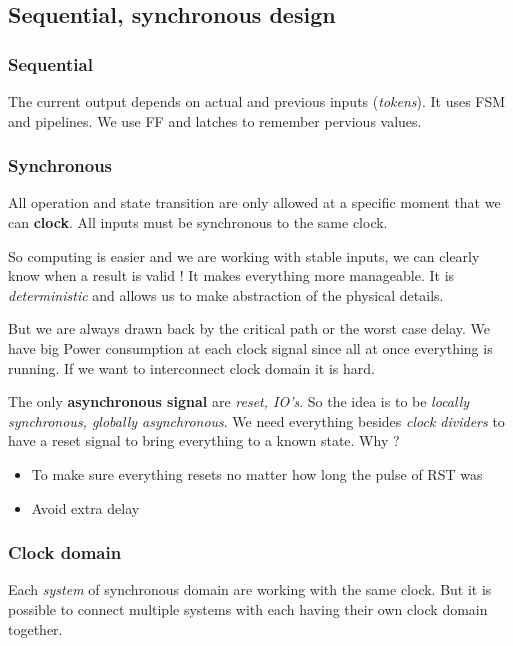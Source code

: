 \documentclass{report}
\begin{document}
\subsection{Sequential, synchronous design}

\subsubsection{Sequential}

The current output depends on actual and previous inputs (\textit{tokens}). It uses FSM and pipelines. We use FF and latches to remember pervious values.

\subsubsection{Synchronous}

All operation and state transition are only allowed at a specific moment that we can \textbf{clock}. All inputs must be synchronous to the same clock.

So computing is easier and we are working with stable inputs, we can clearly know when a result is valid ! It makes everything more manageable. It is \textit{deterministic} and allows us to make abstraction of the physical details.

But we are always drawn back by the critical path or the worst case delay. We have big Power consumption at each clock signal since all at once everything is running. If we want to interconnect clock domain it is hard.

The only \textbf{asynchronous signal} are \textit{reset, IO's}. So the idea is to be \textit{locally synchronous, globally asynchronous}. We need everything besides \textit{clock dividers} to have a reset signal to bring everything to a known state. Why ?

\begin{itemize}
    \item To make sure everything resets no matter how long the pulse of RST was
    \item Avoid extra delay
\end{itemize}

\subsubsection{Clock domain}

Each \textit{system} of synchronous domain are working with the same clock. But it is possible to connect multiple systems with each having their own clock domain together.
\end{document}
